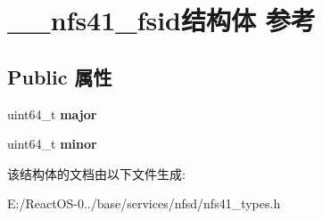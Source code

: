 \hypertarget{struct____nfs41__fsid}{}\section{\+\_\+\+\_\+nfs41\+\_\+fsid结构体 参考}
\label{struct____nfs41__fsid}
\subsection*{Public 属性}
\begin{DoxyCompactItemize}
\item 
\mbox{\label{struct____nfs41__fsid_a48329ff71be32b2ad44c347b79adbd3d}} 
uint64\+\_\+t {\bfseries major}
\item 
\mbox{\label{struct____nfs41__fsid_a8388b505d05ad2704e244559b203d427}} 
uint64\+\_\+t {\bfseries minor}
\end{DoxyCompactItemize}


该结构体的文档由以下文件生成\+:\begin{DoxyCompactItemize}
\item 
E\+:/\+React\+O\+S-\/0../base/services/nfsd/nfs41\+\_\+types.\+h\end{DoxyCompactItemize}
